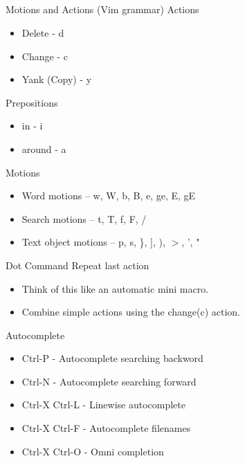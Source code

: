\documentclass{beamer}
\begin{document}
    \subsection{}
    \begin{frame}{Motions and Actions (Vim grammar)}
        Actions
        \begin{itemize}
            \item Delete - d
            \item Change - c
            \item Yank (Copy) - y
        \end{itemize}
        Prepositions
        \begin{itemize}
            \item in - i
            \item around - a
        \end{itemize}
        Motions
        \begin{itemize}
            \item Word motions -- w, W, b, B, e, ge, E, gE
            \item Search motions -- t, T, f, F, /
            \item Text object motions -- p, s, \}, ], ), $>$, ', "
        \end{itemize}
    \end{frame}
    \begin{frame}{Dot Command}
        Repeat last action
        \begin{itemize}
            \item Think of this like an automatic mini macro.
            \item Combine simple actions using the change(c) action.
        \end{itemize}
    \end{frame}
    \begin{frame}{Autocomplete}
        \begin{itemize}
            \item Ctrl-P - Autocomplete searching backword
            \item Ctrl-N - Autocomplete searching forward
            \item Ctrl-X Ctrl-L - Linewise autocomplete
            \item Ctrl-X Ctrl-F - Autocomplete filenames
            \item Ctrl-X Ctrl-O - Omni completion
        \end{itemize}
    \end{frame}
\end{document}
